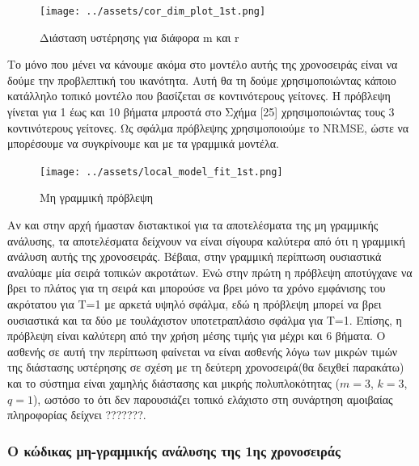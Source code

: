 \documentclass[11pt,]{article}
\begin{document}
\begin{figure}
\centering
\texttt{[image: ../assets/cor\_dim\_plot\_1st.png]}
\caption{Διάσταση υστέρησης για διάφορα m και r}
\end{figure}

Το μόνο που μένει να κάνουμε ακόμα στο μοντέλο αυτής της χρονοσειράς
είναι να δούμε την προβλεπτική του ικανότητα. Αυτή θα τη δούμε
χρησιμοποιώντας κάποιο κατάλληλο τοπικό μοντέλο που βασίζεται σε
κοντινότερους γείτονες. Η πρόβλεψη γίνεται για 1 έως και 10 βήματα
μπροστά στο Σχήμα {[}25{]} χρησιμοποιώντας τους 3 κοντινότερους
γείτονες. Ως σφάλμα πρόβλεψης χρησιμοποιούμε το NRMSE, ώστε να
μπορέσουμε να συγκρίνουμε και με τα γραμμικά μοντέλα.

\begin{figure}
\centering
\texttt{[image: ../assets/local\_model\_fit\_1st.png]}
\caption{Μη γραμμική πρόβλεψη}
\end{figure}

Αν και στην αρχή ήμασταν διστακτικοί για τα αποτελέσματα της μη
γραμμικής ανάλυσης, τα αποτελέσματα δείχνουν να είναι σίγουρα καλύτερα
από ότι η γραμμική ανάλυση αυτής της χρονοσειράς. Βέβαια, στην γραμμική
περίπτωση ουσιαστικά αναλύαμε μία σειρά τοπικών ακροτάτων. Ενώ στην
πρώτη η πρόβλεψη αποτύγχανε να βρει το πλάτος για τη σειρά και μπορούσε
να βρει μόνο τα χρόνο εμφάνισης του ακρότατου για T=1 με αρκετά υψηλό
σφάλμα, εδώ η πρόβλεψη μπορεί να βρει ουσιαστικά και τα δύο με
τουλάχιστον υποτετραπλάσιο σφάλμα για T=1. Επίσης, η πρόβλεψη είναι
καλύτερη από την χρήση μέσης τιμής για μέχρι και 6 βήματα. Ο ασθενής σε
αυτή την περίπτωση φαίνεται να είναι ασθενής λόγω των μικρών τιμών της
διάστασης υστέρησης σε σχέση με τη δεύτερη χρονοσειρά(θα δειχθεί
παρακάτω) και το σύστημα είναι χαμηλής διάστασης και μικρής
πολυπλοκότητας (\(m=3\), \(k=3\), \(q=1\)), ωστόσο το ότι δεν
παρουσιάζει τοπικό ελάχιστο στη συνάρτηση αμοιβαίας πληροφορίας δείχνει
???????.

\hypertarget{ux3bf-ux3baux3ceux3b4ux3b9ux3baux3b1ux3c2-ux3bcux3b7-ux3b3ux3c1ux3b1ux3bcux3bcux3b9ux3baux3aeux3c2-ux3b1ux3bdux3acux3bbux3c5ux3c3ux3b7ux3c2-ux3c4ux3b7ux3c2-1ux3b7ux3c2-ux3c7ux3c1ux3bfux3bdux3bfux3c3ux3b5ux3b9ux3c1ux3acux3c2}{%
\subsubsection{Ο κώδικας μη-γραμμικής ανάλυσης της 1ης
χρονοσειράς}\label{ux3bf-ux3baux3ceux3b4ux3b9ux3baux3b1ux3c2-ux3bcux3b7-ux3b3ux3c1ux3b1ux3bcux3bcux3b9ux3baux3aeux3c2-ux3b1ux3bdux3acux3bbux3c5ux3c3ux3b7ux3c2-ux3c4ux3b7ux3c2-1ux3b7ux3c2-ux3c7ux3c1ux3bfux3bdux3bfux3c3ux3b5ux3b9ux3c1ux3acux3c2}}
\end{document}
